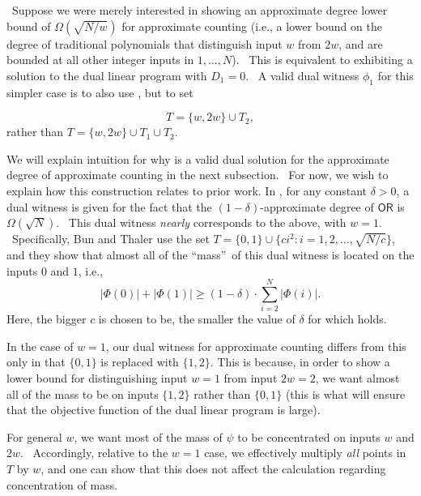 \label{sec:intuition}

 \ Suppose we were merely interested in showing an
approximate degree lower bound of $\Omega (\sqrt{N/w})$ for approximate
counting (i.e., a lower bound on the degree of traditional polynomials that
distinguish input $w$ from $2w$, and are bounded at all other integer inputs
in $1,\dots ,N$). \ This is equivalent to exhibiting a solution to the dual
linear program with $D_{1}=0$. \ A valid dual witness $\phi_1$ for this
simpler case is to also use , but to set

\begin{equation}  \label{simplerT1}
T= \{w, 2w\} \cup T_2,
\end{equation}
rather than $T=\{w, 2w\} \cup T_1 \cup T_2$.

We will explain intuition for why  is a valid dual
solution for the approximate degree of approximate counting in the next
subsection. \ For now, we wish to explain how this construction relates to
prior work. In \cite{bt13}, for any constant $\delta >0$, a dual
witness is given for the fact that the $(1-\delta )$-approximate degree
of $\mathsf{OR}$ is $\Omega (\sqrt{N})$. \ This dual witness \emph{nearly}
corresponds to the above, with $w=1$. \ Specifically, Bun and Thaler \cite{bt13} use the
set $T=\{0,1\}\cup \{ci^{2}\colon i=1,2,\dots ,\sqrt{N/c}\}$, and they show
that almost all of the \textquotedblleft mass\textquotedblright\ of this
dual witness is located on the inputs $0$ and $1$, i.e.,
\begin{equation}
\left\vert \Phi (0)\right\vert +\left\vert \Phi (1)\right\vert \geq
(1-\delta )\cdot \sum_{i=2}^{N}\left\vert \Phi (i)\right\vert .
\label{epseq}
\end{equation}
Here, the bigger $c$ is chosen to be, the smaller the value of $\delta$
for which  holds.

In the case of $w=1$, our dual witness for approximate counting differs from
this only in that $\{0, 1\}$ is replaced with $\{1, 2\}$. This is
because, in order to show a lower bound for distinguishing input $w=1$ from
input $2w=2$, we want almost all of the mass to be on inputs $\{1, 2\}$
rather than $\{0, 1\}$ (this is what will ensure that the objective function
of the dual linear program is large).

For general $w$, we want most of the mass of $\psi $ to be concentrated on
inputs $w$ and $2w$. \ Accordingly, relative to the $w=1$ case, we
effectively multiply \emph{all} points in $T$ by $w$, and one can show that
this does not affect the calculation regarding concentration of mass.

